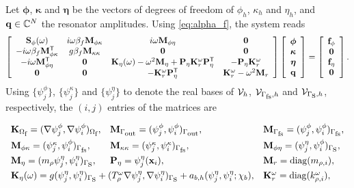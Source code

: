 Let $\boldsymbol{\phi}$, $\boldsymbol{\kappa}$ and $\boldsymbol{\eta}$ be the vectors of degrees of freedom of $\phi_h$, $\kappa_h$ and $\eta_h$, and $\mathbf{q}\in\mathbb{C}^N$ the resonator amplitudes. Using \eqref{eq:alpha_f}, the system reads
\begin{equation}\label{eq:algebraic_system}
    \left[\begin{array}{cccc}
        \mathbf{S}_{\phi}(\omega) & i\omega\beta_f\mathbf{M}_{\phi\kappa} & i\omega\mathbf{M}_{\phi\eta} & \mathbf{0}\\
        -i\omega\beta_f\mathbf{M}_{\phi\kappa}^{\mathsf T} & g\beta_f\mathbf{M}_{\kappa\kappa} & \mathbf{0} & \mathbf{0}\\
        -i\omega\mathbf{M}_{\phi\eta}^{\mathsf T} & \mathbf{0} & \mathbf{K}_{\eta}(\omega)-\omega^2\mathbf{M}_{\eta}+\mathbf{P}_\eta\mathbf{K}_r^\omega\mathbf{P}_\eta^{\mathsf T} & -\mathbf{P}_\eta\mathbf{K}_r^\omega\\
        \mathbf{0} & \mathbf{0} & -\mathbf{K}_r^\omega\mathbf{P}_\eta^{\mathsf T} & \mathbf{K}_r^\omega-\omega^2\mathbf{M}_r
    \end{array}\right]
    \left[\begin{array}{c}\boldsymbol{\phi}\\ \boldsymbol{\kappa}\\ \boldsymbol{\eta}\\ \mathbf{q}\end{array}\right]
    =
    \left[\begin{array}{c}\mathbf{f}_\phi\\ \mathbf{0}\\ \mathbf{f}_\eta\\ \mathbf{0}\end{array}\right].
\end{equation}
Using $\{\psi^\phi_j\}$, $\{\psi^\kappa_j\}$ and $\{\psi^\eta_j\}$ to denote the real bases of $\mathcal{V}_h$, $\mathcal{V}_{\Gamma_{\mbox{\scriptsize fs}},h}$ and $\mathcal{V}_{\Gamma_{\mbox{s}},h}$, respectively, the $(i,j)$ entries of the matrices are
\begin{linenomath}
\begin{equation}\label{eq:algebraic_matrices}
\begin{array}{lll}
    \mathbf{K}_{\Of}=(\nabla\psi^\phi_j,\nabla\psi^\phi_i)_{\Of}, &
    \mathbf{M}_{\Gout}=(\psi^\phi_j,\psi^\phi_i)_{\Gout}, &
    \mathbf{M}_{\Gf}=(\psi^\phi_j,\psi^\phi_i)_{\Gf}, \\[4pt]
    \mathbf{M}_{\phi\kappa}=(\psi^\kappa_j,\psi^\phi_i)_{\Gf}, &
    \mathbf{M}_{\kappa\kappa}=(\psi^\kappa_j,\psi^\kappa_i)_{\Gf}, &
    \mathbf{M}_{\phi\eta}=(\psi^\eta_j,\psi^\phi_i)_{\Gm}, \\[4pt]
    \mathbf{M}_{\eta}=(m_\rho\psi^\eta_j,\psi^\eta_i)_{\Gm}, &
    \mathbf{P}_\eta=\psi^\eta_j(\xvec_i), &
    \mathbf{M}_r=\mathrm{diag}(m_{\rho,i}), \\[4pt]
    \multicolumn{2}{l}{\mathbf{K}_\eta(\omega)=g(\psi^\eta_j,\psi^\eta_i)_{\Gm}+(T_\rho^\omega\nabla\psi^\eta_j,\nabla\psi^\eta_i)_{\Gm}+a_{b,h}(\psi^\eta_j,\psi^\eta_i;\chi_b),} &
    \mathbf{K}_r^\omega=\mathrm{diag}(k_{\rho,i}^\omega),
\end{array}
\end{equation}
\end{linenomath}
